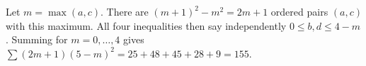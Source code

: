 Let $m=\max(a,c)$. There are $(m+1)^2-m^2=2m+1$ ordered pairs $(a,c)$ with this maximum. All four inequalities then say independently $0\le b,d\le4-m$. Summing for $m=0,\ldots,4$ gives $\sum(2m+1)(5-m)^2=25+48+45+28+9=\boxed{155}$.
